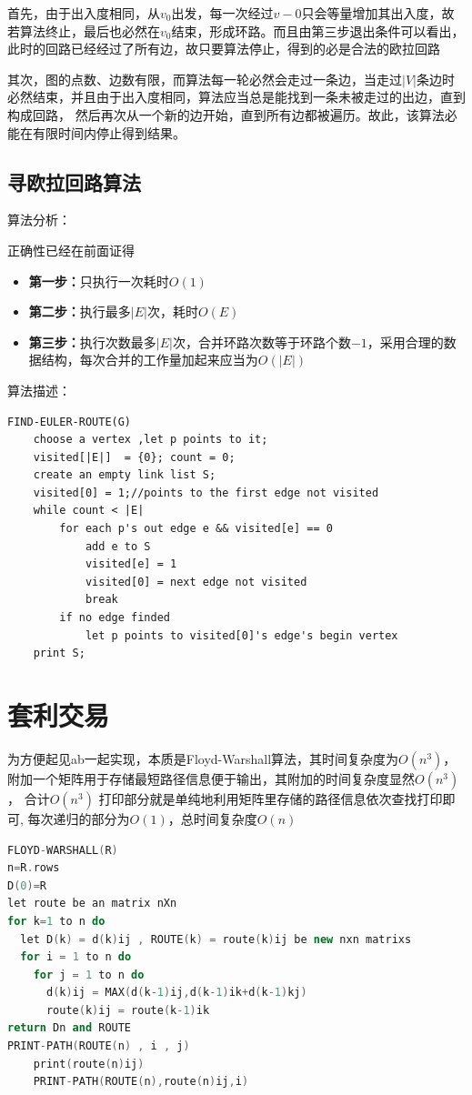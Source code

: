 \documentclass[cn,11pt,chinese]{elegantbook}
\begin{document}
首先，由于出入度相同，从$v_0$出发，每一次经过$v-0$只会等量增加其出入度，故若算法终止，最后也必然在$v_0$结束，形成环路。而且由第三步退出条件可以看出，
此时的回路已经经过了所有边，故只要算法停止，得到的必是合法的欧拉回路

其次，图的点数、边数有限，而算法每一轮必然会走过一条边，当走过$|V|$条边时必然结束，并且由于出入度相同，算法应当总是能找到一条未被走过的出边，直到构成回路，
然后再次从一个新的边开始，直到所有边都被遍历。故此，该算法必能在有限时间内停止得到结果。

\subsection{寻欧拉回路算法}

算法分析：

正确性已经在前面证得
\begin{itemize}
	\item \textbf{第一步：}只执行一次耗时$O(1)$
	\item \textbf{第二步：}执行最多$|E|$次，耗时$O(E)$
	\item \textbf{第三步：}执行次数最多$|E|$次，合并环路次数等于环路个数$-1$，采用合理的数据结构，每次合并的工作量加起来应当为$O(|E|)$
\end{itemize}

算法描述：
\begin{lstlisting}
FIND-EULER-ROUTE(G)
	choose a vertex ,let p points to it;
	visited[|E|]  = {0}; count = 0;
	create an empty link list S;
	visited[0] = 1;//points to the first edge not visited
	while count < |E|
		for each p's out edge e && visited[e] == 0
			add e to S
			visited[e] = 1
			visited[0] = next edge not visited
			break
		if no edge finded
			let p points to visited[0]'s edge's begin vertex
	print S;
\end{lstlisting}

\section{套利交易}
为方便起见ab一起实现，本质是Floyd-Warshall算法，其时间复杂度为$O(n^3)$，
附加一个矩阵用于存储最短路径信息便于输出，其附加的时间复杂度显然$O(n^3)$，
合计$O(n^3)$
打印部分就是单纯地利用矩阵里存储的路径信息依次查找打印即可,
每次递归的部分为$O(1)$，总时间复杂度$O(n)$
\begin{lstlisting}[language = c++]
FLOYD-WARSHALL(R)
n=R.rows
D(0)=R
let route be an matrix nXn
for k=1 to n do
  let D(k) = d(k)ij , ROUTE(k) = route(k)ij be new nxn matrixs
  for i = 1 to n do
    for j = 1 to n do
      d(k)ij = MAX(d(k-1)ij,d(k-1)ik+d(k-1)kj)
      route(k)ij = route(k-1)ik
return Dn and ROUTE
PRINT-PATH(ROUTE(n) , i , j)
	print(route(n)ij)
	PRINT-PATH(ROUTE(n),route(n)ij,i)
\end{lstlisting}
\end{document}
